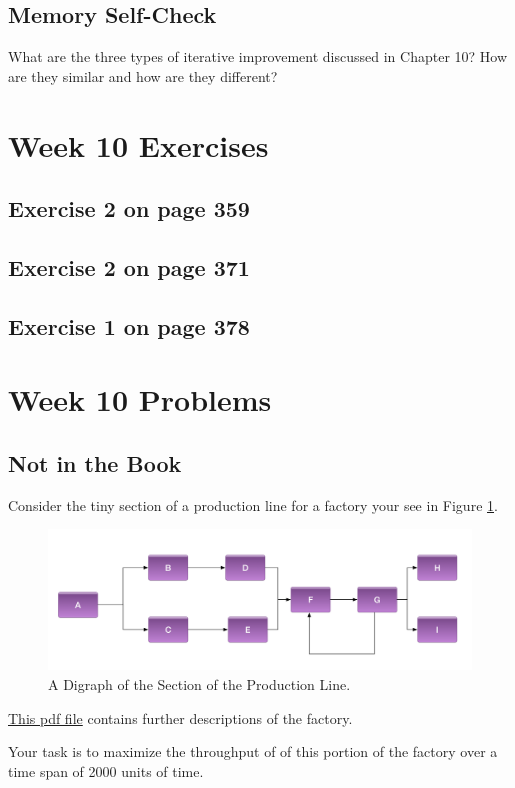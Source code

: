 \documentclass[12pt]{amsart}
\begin{document}
\subsection{Memory Self-Check}
What are the three types of iterative improvement discussed in Chapter 10? How are they similar and how are they different?
 \section{Week 10 Exercises}
\subsection{ Exercise 2 on page 359}
\subsection{Exercise 2 on page 371} 
\subsection{Exercise 1 on page 378} 


\section{Week 10 Problems}
\subsection{Not in the Book}
Consider the tiny section of a production line for a factory your see in Figure \ref{fig:factory1}. 
\begin{figure}[htb]
  \includegraphics[width=\linewidth]{../support_files/tiny_factory.png}
  \caption{A Digraph of the Section of the Production Line.}
  \label{fig:factory1}
\end{figure}

\href{run:../support_files/tiny_factory_step_descriptions.pdff}{This pdf file} contains further descriptions of the factory.

Your task is to maximize the throughput of of this portion of the factory over a time span of 2000 units of time.
\end{document}
